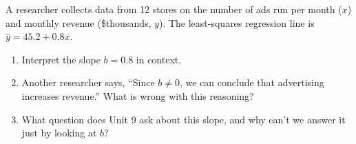 \documentclass[10pt]{article}
\begin{document}
\namedateperiod

\vspace{0.1in}
A researcher collects data from 12 stores on the number of ads run per month ($x$) and
monthly revenue (\$thousands, $y$). The least-squares regression line is
$\hat{y} = 45.2 + 0.8x$.

\begin{enumerate}

  \item Interpret the slope $b = 0.8$ in context.


  \item Another researcher says, ``Since $b \ne 0$, we can conclude that advertising
        increases revenue.'' What is wrong with this reasoning?


  \item What question does Unit 9 ask about this slope, and why can't we answer it just
        by looking at $b$?


\end{enumerate}
\end{document}
